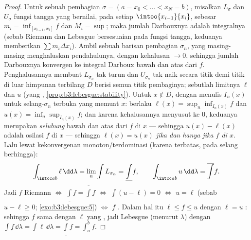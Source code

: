 \begin{proof}
Untuk sebuah pembagian $\sigma = (a = x_0 < \dots < x_N = b)$, misalkan
$L_\sigma$ dan $U_\sigma$ fungsi tangga yang bernilai, pada setiap
$\intoo{x_{i-1}}{x_i}$, sebesar $m_i = \inf_{[x_{i-1}, x_i]}f$ dan
$M_i = \sup$; maka jumlah Darbouxnya adalah integralnya (sebab Riemann dan
Lebesgue bersesuaian pada fungsi tangga, keduanya memberikan $\sum
m_i\Delta x_i$). Ambil sebuah barisan pembagian $\sigma_n$,
yang masing-masing menghaluskan pendahulunya, dengan kehalusan $\to 0$, sehingga jumlah Darbouxnya
konvergen ke integral Darboux bawah dan atas dari $f$.
Penghalusannya membuat $L_{\sigma_n}$ tak turun dan
$U_{\sigma_n}$ tak naik secara titik demi titik di luar himpunan terbilang
$D$ berisi semua titik pembaginya; sebutlah limitnya $\ell$ dan $u$
(yang , \cref{prop:b3:lebesgue:stability}). Untuk $x \notin
D$, dengan menulis $I_n(x)$ untuk selang-$\sigma_n$ terbuka yang
memuat $x$: berlaku $\ell(x) = \sup_n\inf_{I_n(x)}f$ dan $u(x) =
\inf_n\sup_{I_n(x)}f$; dan karena kehalusannya menyusut ke $0$, keduanya
merupakan \emph{selubung} bawah dan atas dari $f$ di $x$
--- sehingga $u(x) - \ell(x)$ adalah osilasi $f$ di $x$ --- sehingga
\emph{$\ell(x) = u(x)$ jika dan hanya jika $f$  di $x$}. Lalu lewat kekonvergenan monoton/terdominasi (karena terbatas, pada selang berhingga):
\[
\int_{\intcc ab}\ell\,\dd\lambda = \lim_n\int L_{\sigma_n}
= \underline{\int}f,
\qquad
\int_{\intcc ab}u\,\dd\lambda = \overline{\int}f .
\]
Jadi $f$  Riemann $\iff$ $\underline\int f =
\overline\int f$ $\iff$ $\int(u - \ell) = 0$ $\iff$ $u = \ell$
 (sebab $u - \ell \geq 0$; \cref{exo:b3:lebesgue:5}) $\iff$ $f$
 . Dalam hal itu $\ell \leq f \leq u$ dengan $\ell =
u$ : sehingga $f$ sama dengan $\ell$ yang  , jadi
 Lebesgue (menurut  $\lambda$) dengan
$\int f\,\dd\lambda = \int\ell\,\dd\lambda = \underline\int f =
\int_a^bf$.
\end{proof}

